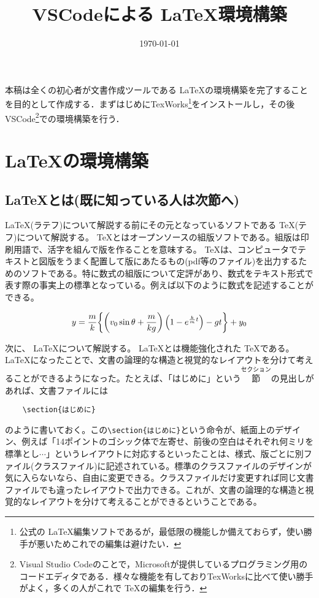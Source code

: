 \documentclass[]{ltjsarticle}
\begin{document}
  \title{VSCodeによる \LaTeX 環境構築}
  \author{}
  \date{\today}
  \maketitle
  
  本稿は全くの初心者が文書作成ツールである \LaTeX の環境構築を完了することを目的として作成する．まずはじめにTexWorks\footnote{公式の \LaTeX 編集ソフトであるが，最低限の機能しか備えておらず，使い勝手が悪いためこれでの編集は避けたい．}をインストールし，その後VSCode\footnote{Visual Studio Codeのことで，Microsoftが提供しているプログラミング用のコードエディタである．様々な機能を有しておりTexWorksに比べて使い勝手がよく，多くの人がこれで \TeX の編集を行う．}での環境構築を行う．
  
  \section{ \LaTeX の環境構築}
  
  \subsection{ \LaTeX とは(既に知っている人は次節へ)}
  
  \LaTeX (ラテフ)について解説する前にその元となっているソフトである \TeX (テフ)について解説する。 \TeX とはオープンソースの組版ソフトである。組版は印刷用語で、活字を組んで版を作ることを意味する。 \TeX は、コンピュータでテキストと図版をうまく配置して版にあたるもの(pdf等のファイル)を出力するためのソフトである。特に数式の組版について定評があり、数式をテキスト形式で表す際の事実上の標準となっている。例えば以下のように数式を記述することができる。

  \[y= \frac{m}{k} \qty{\left(v_0 \sin\theta + \frac{m}{kg} \right) \qty( 1 - e^{\frac{k}{m} t} ) - gt } + y_0\]

  次に、 \LaTeX について解説する。 \LaTeX とは機能強化された \TeX である。 \LaTeX になったことで、文書の論理的な構造と視覚的なレイアウトを分けて考えることができるようになった。たとえば、「はじめに」という$\overset{セクション}{節}$の見出しがあれば、文書ファイルには
  \begin{verbatim}
    \section{はじめに}
  \end{verbatim}
  のように書いておく。この\verb|\section{はじめに}|という命令が、紙面上のデザイン、例えば「14ポイントのゴシック体で左寄せ、前後の空白はそれぞれ何ミリを標準とし$\cdots$」というレイアウトに対応するといったことは、様式、版ごとに別ファイル(クラスファイル)に記述されている。標準のクラスファイルのデザインが気に入らないなら、自由に変更できる。クラスファイルだけ変更すれば同じ文書ファイルでも違ったレイアウトで出力できる。これが、文書の論理的な構造と視覚的なレイアウトを分けて考えることができるということである。
\end{document}
